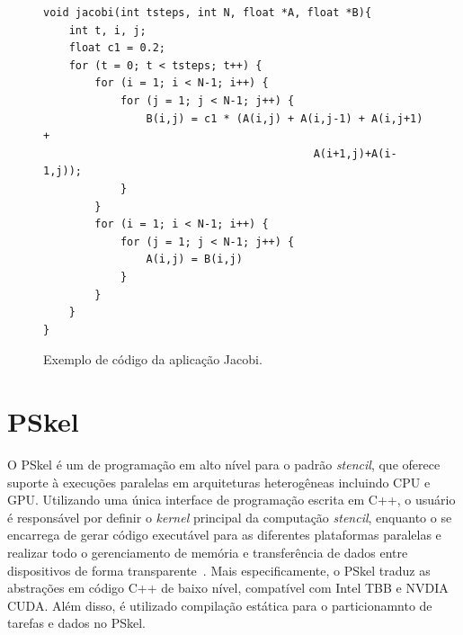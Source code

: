 \renewcommand{\lstlistingname}{Código}


\begin{figure}[bh] %
\centering          %
\caption*{Exemplo de código da aplicação Jacobi.}
\begin{lstlisting}[]
void jacobi(int tsteps, int N, float *A, float *B){
    int t, i, j;
    float c1 = 0.2;
    for (t = 0; t < tsteps; t++) {
        for (i = 1; i < N-1; i++) {
            for (j = 1; j < N-1; j++) {
                B(i,j) = c1 * (A(i,j) + A(i,j-1) + A(i,j+1) +
                                          A(i+1,j)+A(i-1,j));
            }
        }
        for (i = 1; i < N-1; i++) {
            for (j = 1; j < N-1; j++) {
                A(i,j) = B(i,j)
            }
        }
    }
}
\end{lstlisting}
\end{figure}




\section{PSkel}
O PSkel é um \fw de programação em alto nível para o padrão \textit{stencil}, que
oferece suporte à execuções paralelas em arquiteturas heterogêneas incluindo CPU
e GPU. Utilizando uma única interface de programação escrita em C++, o usuário é
responsável por definir o \textit{kernel} principal da computação \textit{stencil},
enquanto o \fw se encarrega de gerar código executável para as diferentes
plataformas paralelas e realizar todo o gerenciamento de memória e transferência
de dados entre dispositivos de forma transparente~\cite{pereira15}. Mais
especificamente, o PSkel traduz as abstrações em código C++ de baixo nível,
compatível com Intel TBB e NVDIA CUDA. Além disso, é utilizado compilação
estática para o particionamnto de tarefas e dados no PSkel.

